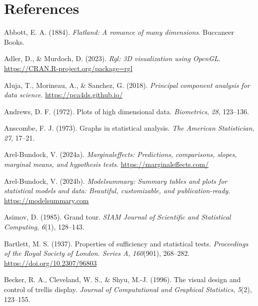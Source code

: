 \documentclass[
  letterpaper,
  10pt,
  krantz2]{krantz}
\newlength{\cslhangindent}
\newenvironment{CSLReferences}[2] %
 {\begin{list}{}{%
  \setlength{\itemindent}{0pt}
  \setlength{\leftmargin}{0pt}
  \setlength{\parsep}{0pt}
  \ifodd #1
   \setlength{\leftmargin}{\cslhangindent}
   \setlength{\itemindent}{-1\cslhangindent}
  \fi
  \setlength{\itemsep}{#2\baselineskip}}}
 {\end{list}}
\begin{document}
\chapter*{References}\label{references}


\label{refs}
\begin{CSLReferences}{1}{0}
Abbott, E. A. (1884). \emph{Flatland: A romance of many dimensions}.
Buccaneer Books.

Adler, D., \& Murdoch, D. (2023). \emph{Rgl: 3D visualization using
OpenGL}. \url{https://CRAN.R-project.org/package=rgl}

Aluja, T., Morineau, A., \& Sanchez, G. (2018). \emph{Principal
component analysis for data science}. \url{https://pca4ds.github.io/}

Andrews, D. F. (1972). Plots of high dimensional data.
\emph{Biometrics}, \emph{28}, 123--136.

Anscombe, F. J. (1973). Graphs in statistical analysis. \emph{The
American Statistician}, \emph{27}, 17--21.

Arel-Bundock, V. (2024a). \emph{Marginaleffects: Predictions,
comparisons, slopes, marginal means, and hypothesis tests}.
\url{https://marginaleffects.com/}

Arel-Bundock, V. (2024b). \emph{Modelsummary: Summary tables and plots
for statistical models and data: Beautiful, customizable, and
publication-ready}. \url{https://modelsummary.com}

Asimov, D. (1985). Grand tour. \emph{SIAM Journal of Scientific and
Statistical Computing}, \emph{6}(1), 128--143.

Bartlett, M. S. (1937). Properties of sufficiency and statistical tests.
\emph{Proceedings of the Royal Society of London. Series A},
\emph{160}(901), 268--282. \url{https://doi.org/10.2307/96803}

Becker, R. A., Cleveland, W. S., \& Shyu, M.-J. (1996). The visual
design and control of trellis display. \emph{Journal of Computational
and Graphical Statistics}, \emph{5}(2), 123--155.


\end{CSLReferences}
\end{document}
